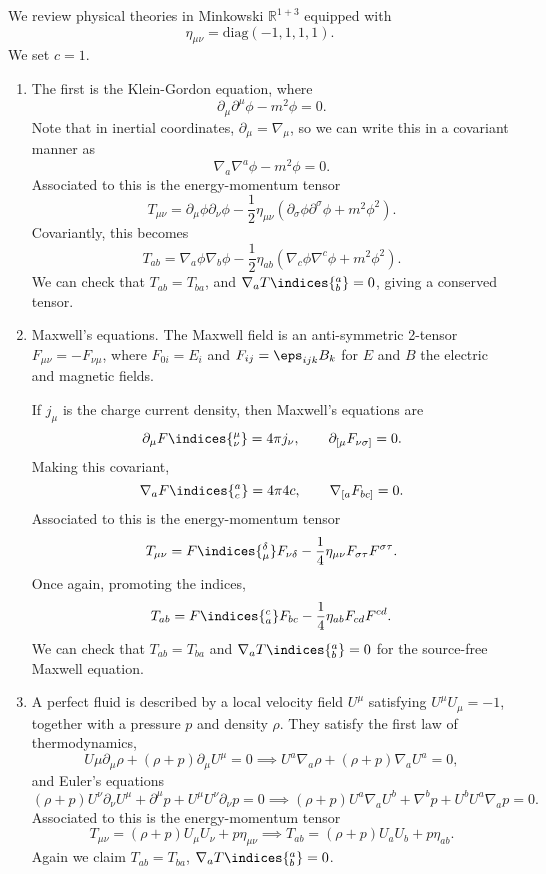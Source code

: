 \documentclass[12pt]{article}
\begin{document}
We review physical theories in Minkowski $\mathbb{R}^{1 + 3}$ equipped with
\[
\eta_{\mu\nu} = \mathrm{diag}(-1, 1, 1, 1).
\]
We set $c = 1$.
\begin{enumerate}
	\item The first is the Klein-Gordon equation, where
		\[
		\partial_\mu \partial^\mu \phi - m^2 \phi = 0.
		\]
		Note that in inertial coordinates, $\partial_\mu = \nabla_\mu$, so we can write this in a covariant manner as
		\[
		\nabla_a \nabla^a \phi - m^2 \phi = 0.
		\]
		Associated to this is the energy-momentum tensor
		\[
		T_{\mu\nu} = \partial_\mu \phi \partial_\nu \phi - \frac{1}{2} \eta_{\mu\nu} (\partial_\sigma \phi \partial^\sigma \phi + m^2 \phi^2).
		\]
		Covariantly, this becomes
		\[
		T_{ab} = \nabla_a \phi \nabla_b \phi - \frac{1}{2} \eta_{ab} (\nabla_c \phi \nabla^c \phi + m^2 \phi^2).
		\]
		We can check that $T_{ab} = T_{ba}$, and $\nabla_a T\indices{^{a}_{b}} = 0$, giving a conserved tensor.
	\item Maxwell's equations. The Maxwell field is an anti-symmetric 2-tensor $F_{\mu\nu} = - F_{\nu\mu}$, where $F_{0i} = E_i$ and $F_{ij} = \eps_{ijk} B_k$ for $E$ and $B$ the electric and magnetic fields.

		If $j_\mu$ is the charge current density, then Maxwell's equations are
		\[
			\partial_\mu F\indices{^{\mu}_{\nu}} = 4 \pi j_\nu, \qquad \partial_{[\mu} F_{\nu \sigma]} = 0.
		\]
		Making this covariant,
		\[
			\nabla_a F\indices{^{a}_{c}} = 4 \pi 4c, \qquad \nabla_{[a} F_{bc]} = 0.
		\]
		Associated to this is the energy-momentum tensor
		\[
		T_{\mu\nu} = F\indices{_{\mu}^{\delta}} F_{\nu\delta} - \frac{1}{4} \eta_{\mu\nu} F_{\sigma\tau} F^{\sigma\tau}.
		\]
		Once again, promoting the indices,
		\[
		T_{ab} = F\indices{_{a}^{c}} F_{bc} - \frac{1}{4} \eta_{ab} F_{cd} F^{cd}.
		\]
		We can check that $T_{ab} = T_{ba}$ and $\nabla_a T\indices{^{a}_{b}} = 0$ for the source-free Maxwell equation.
	\item A perfect fluid is described by a local velocity field $U^{\mu}$ satisfying $U^\mu U_\mu = -1$, together with a pressure $p$ and density $\rho$. They satisfy the first law of thermodynamics,
		\[
		U{\mu} \partial_\mu \rho + (\rho + p) \partial_\mu U^\mu = 0 \implies U^a \nabla_a \rho + (\rho + p)\nabla_a U^a = 0,
		\]
		and Euler's equations
		\[
			(\rho + p) U^\nu \partial_\nu U^\mu + \partial^\mu p + U^\mu U^\nu \partial_\nu p = 0 \implies (\rho + p) U^a \nabla_a U^b + \nabla^b p + U^b U^a \nabla_a p = 0.
		\]
		Associated to this is the energy-momentum tensor
		\[
		T_{\mu\nu} = (\rho + p) U_\mu U_\nu + p \eta_{\mu\nu} \implies T_{ab} = (\rho + p) U_a U_b + p \eta_{ab}.
		\]
		Again we claim $T_{ab} = T_{ba}$, $\nabla_a T\indices{^{a}_{b}} = 0$.
\end{enumerate}
\end{document}
